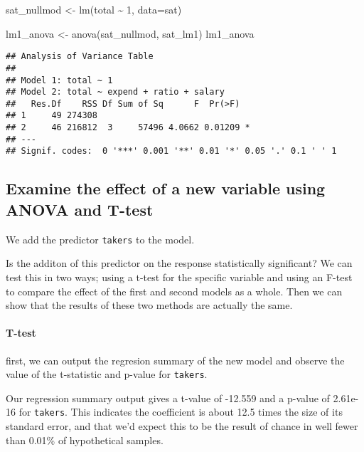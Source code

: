 \documentclass[
]{article}
\newenvironment{Shaded}{\begin{snugshade}}{\end{snugshade}}
\newcommand{\AttributeTok}[1]{\textcolor[rgb]{0.77,0.63,0.00}{#1}}
\newcommand{\DecValTok}[1]{\textcolor[rgb]{0.00,0.00,0.81}{#1}}
\newcommand{\FunctionTok}[1]{\textcolor[rgb]{0.00,0.00,0.00}{#1}}
\newcommand{\NormalTok}[1]{#1}
\newcommand{\OtherTok}[1]{\textcolor[rgb]{0.56,0.35,0.01}{#1}}
\newcommand{\SpecialCharTok}[1]{\textcolor[rgb]{0.00,0.00,0.00}{#1}}
\begin{document}
\begin{Shaded}
\begin{Highlighting}[]
\NormalTok{sat\_nullmod }\OtherTok{\textless{}{-}} \FunctionTok{lm}\NormalTok{(total }\SpecialCharTok{\textasciitilde{}} \DecValTok{1}\NormalTok{, }\AttributeTok{data=}\NormalTok{sat)}

\NormalTok{lm1\_anova }\OtherTok{\textless{}{-}} \FunctionTok{anova}\NormalTok{(sat\_nullmod, sat\_lm1)}
\NormalTok{lm1\_anova}
\end{Highlighting}
\end{Shaded}

\begin{verbatim}
## Analysis of Variance Table
## 
## Model 1: total ~ 1
## Model 2: total ~ expend + ratio + salary
##   Res.Df    RSS Df Sum of Sq      F  Pr(>F)  
## 1     49 274308                              
## 2     46 216812  3     57496 4.0662 0.01209 *
## ---
## Signif. codes:  0 '***' 0.001 '**' 0.01 '*' 0.05 '.' 0.1 ' ' 1
\end{verbatim}

\hypertarget{examine-the-effect-of-a-new-variable-using-anova-and-t-test}{%
\subsection{Examine the effect of a new variable using ANOVA and
T-test}\label{examine-the-effect-of-a-new-variable-using-anova-and-t-test}}

We add the predictor \texttt{takers} to the model.

Is the additon of this predictor on the response statistically
significant? We can test this in two ways; using a t-test for the
specific variable and using an F-test to compare the effect of the first
and second models as a whole. Then we can show that the results of these
two methods are actually the same.

\hypertarget{t-test}{%
\paragraph{T-test}\label{t-test}}

first, we can output the regresion summary of the new model and observe
the value of the t-statistic and p-value for \texttt{takers}.

Our regression summary output gives a t-value of -12.559 and a p-value
of 2.61e-16 for \texttt{takers}. This indicates the coefficient is about
12.5 times the size of its standard error, and that we'd expect this to
be the result of chance in well fewer than 0.01\% of hypothetical
samples.
\end{document}
